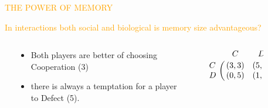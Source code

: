 \documentclass[usenames,dvipsnames,t]{beamer}
\begin{document}
\begin{columns}
    \begin{column}{\linewidth}
    \vspace{1cm}

    \centering
    \textcolor{orange}{\fontsize{180}{400} \selectfont THE POWER OF MEMORY}
    \vspace{0.5cm}

    \Large\textcolor{orange}{In interactions both social and biological is memory
    size advantageous?}
    \end{column}
\end{columns}
\begin{columns}
    \begin{column}{.1\linewidth}
    \end{column}
    \begin{column}{.2\linewidth}
        \vspace{1.1cm}

        \begin{itemize}
            \item Both players are better of choosing Cooperation (3)
            \item there is always a temptation for a player to Defect (5).
        \end{itemize}
    \end{column}
    \begin{column}{.09\linewidth}
    \end{column}
    \begin{column}{.17\linewidth}
        \vspace{0.1cm}

        \large{
        \begin{equation}\label{eq:payoff_matrix}
             \bordermatrix{~ & C & D \cr
                              C & (3, 3) & (5, 0) \cr
                              D & (0, 5) & (1, 1) \cr}
            \end{equation}}
    \end{column}
    \begin{column}{.09\linewidth}
    \end{column}
    \begin{column}{.3\linewidth}
        \begin{center}
            
        \end{center}
    \end{column}
    \begin{column}{.1\linewidth}
    \end{column}
\end{columns}
\end{document}
